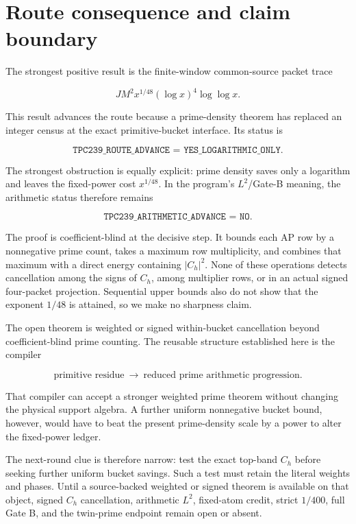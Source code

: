 \section{Route consequence and claim boundary}
\label{sec:boundary}

The strongest positive result is the finite-window common-source packet trace

\[
 JM^2x^{1/48}(\log x)^4\log\log x.
\]

This result advances the route because a prime-density theorem has replaced an
integer census at the exact primitive-bucket interface.  Its status is

\[
 \texttt{TPC239\_ROUTE\_ADVANCE = YES\_LOGARITHMIC\_ONLY}.
\]

The strongest obstruction is equally explicit: prime density saves only a
logarithm and leaves the fixed-power cost $x^{1/48}$.  In the program's
$L^2$/Gate-B meaning, the arithmetic status therefore remains

\[
 \texttt{TPC239\_ARITHMETIC\_ADVANCE = NO}.
\]

The proof is coefficient-blind at the decisive step.  It bounds each AP row by
a nonnegative prime count, takes a maximum row multiplicity, and combines that
maximum with a direct energy containing $|C_h|^2$.  None of these operations
detects cancellation among the signs of $C_h$, among multiplier rows, or in
an actual signed four-packet projection.  Sequential upper bounds also do not
show that the exponent $1/48$ is attained, so we make no sharpness claim.

The open theorem is weighted or signed within-bucket cancellation beyond
coefficient-blind prime counting.  The reusable structure established here is
the compiler

\[
 \boxed{\text{primitive residue}\ \longrightarrow\
        \text{reduced prime arithmetic progression}.}
\]

That compiler can accept a stronger weighted prime theorem without changing
the physical support algebra.  A further uniform nonnegative bucket bound,
however, would have to beat the present prime-density scale by a power to alter
the fixed-power ledger.

The next-round clue is therefore narrow: test the exact top-band $C_h$ before
seeking further uniform bucket savings.  Such a test must retain the literal
weights and phases.  Until a source-backed weighted or signed theorem is
available on that object, signed $C_h$ cancellation, arithmetic $L^2$,
fixed-atom credit, strict $1/400$, full Gate B, and the twin-prime endpoint
remain open or absent.
